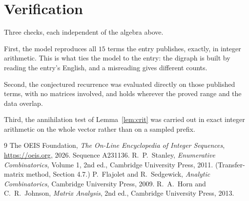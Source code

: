 \documentclass[11pt,a4paper]{article}
\theoremstyle{plain}
\theoremstyle{definition}
\begin{document}
\section{Verification}

Three checks, each independent of the algebra above.

First, the model reproduces all $15$ terms the entry publishes, exactly, in integer
arithmetic. This is what ties the model to the entry: the digraph is built by reading the
entry's English, and a misreading gives different counts.

Second, the conjectured recurrence was evaluated directly on those published terms, with no
matrices involved, and holds wherever the proved range and the data overlap.

Third, the annihilation test of Lemma~\ref{lem:crit} was carried out in exact integer
arithmetic on the whole vector rather than on a sampled prefix.

\begin{thebibliography}{9}
 The OEIS Foundation, \emph{The On-Line Encyclopedia of Integer
Sequences}, \url{https://oeis.org}, 2026. Sequence A231136.
 R.~P.~Stanley, \emph{Enumerative Combinatorics}, Volume 1, 2nd ed.,
Cambridge University Press, 2011. (Transfer-matrix method, Section 4.7.)
 P.~Flajolet and R.~Sedgewick, \emph{Analytic Combinatorics}, Cambridge
University Press, 2009.
 R.~A.~Horn and C.~R.~Johnson, \emph{Matrix Analysis}, 2nd ed., Cambridge
University Press, 2013.
\end{thebibliography}
\end{document}
